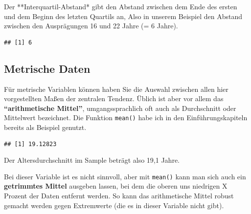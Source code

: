 \documentclass[
]{book}
\newenvironment{Shaded}{\begin{snugshade}}{\end{snugshade}}
\newcommand{\AttributeTok}[1]{\textcolor[rgb]{0.77,0.63,0.00}{#1}}
\newcommand{\ConstantTok}[1]{\textcolor[rgb]{0.00,0.00,0.00}{#1}}
\newcommand{\FloatTok}[1]{\textcolor[rgb]{0.00,0.00,0.81}{#1}}
\newcommand{\FunctionTok}[1]{\textcolor[rgb]{0.00,0.00,0.00}{#1}}
\newcommand{\NormalTok}[1]{#1}
\newcommand{\SpecialCharTok}[1]{\textcolor[rgb]{0.00,0.00,0.00}{#1}}
\begin{document}
Der **Interquartil-Abstand* gibt den Abstand zwischen dem Ende des ersten und dem Beginn des letzten Quartils an, Also in unserem Beispiel den Abstand zwischen den Ausprägungen 16 und 22 Jahre (= 6 Jahre).

\begin{Shaded}
\end{Shaded}

\begin{verbatim}
## [1] 6
\end{verbatim}

\hypertarget{metrische-daten}{%
\subsection{Metrische Daten}\label{metrische-daten}}

Für metrische Variablen können haben Sie die Auswahl zwischen allen hier vorgestellten Maßen der zentralen Tendenz. Üblich ist aber vor allem das \textbf{``arithmetische Mittel''}, umgangssprachlich oft auch als Durchschnitt oder Mittelwert bezeichnet. Die Funktion \texttt{mean()} habe ich in den Einführungskapiteln bereits als Beispiel genutzt.

\begin{Shaded}
\end{Shaded}

\begin{verbatim}
## [1] 19.12823
\end{verbatim}

Der Altersdurchschnitt im Sample beträgt also 19,1 Jahre.

Bei dieser Variable ist es nicht sinnvoll, aber mit \texttt{mean()} kann man sich auch ein \textbf{getrimmtes Mittel} ausgeben lassen, bei dem die oberen uns niedrigen X Prozent der Daten entfernt werden. So kann das arithmetische Mittel robust gemacht werden gegen Extremwerte (die es in dieser Variable nicht gibt).

\begin{Shaded}
\end{Shaded}
\end{document}
